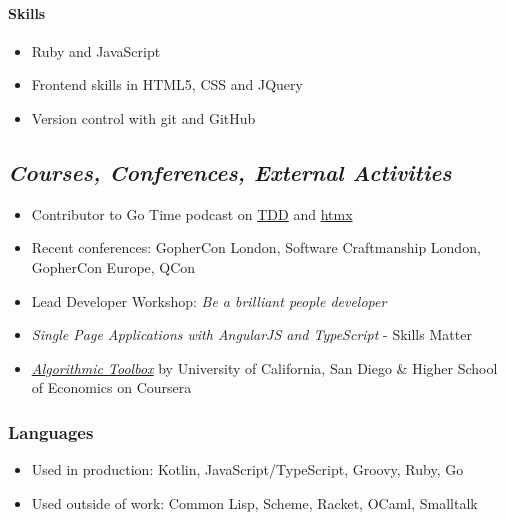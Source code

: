 \hypertarget{skills-2}{%
\paragraph{Skills}\label{skills-2}}

\begin{itemize}
\tightlist
\item
  Ruby and JavaScript
\item
  Frontend skills in HTML5, CSS and JQuery
\item
  Version control with git and GitHub
\end{itemize}

\hypertarget{courses-conferences-external-activities}{%
\subsection{\texorpdfstring{\emph{Courses, Conferences, External
Activities}}{Courses, Conferences, External Activities}}\label{courses-conferences-external-activities}}

\begin{itemize}
\tightlist
\item
  Contributor to Go Time podcast on
  \href{https://changelog.com/gotime/185}{TDD} and
  \href{https://changelog.com/gotime/266}{htmx}
\item
  Recent conferences: GopherCon London, Software Craftmanship London,
  GopherCon Europe, QCon
\item
  Lead Developer Workshop: \emph{Be a brilliant people developer}
\item
  \emph{Single Page Applications with AngularJS and TypeScript} - Skills
  Matter
\item
  \href{https://www.coursera.org/account/accomplishments/records/C58NGM7GQS84}{\emph{Algorithmic
  Toolbox}} by University of California, San Diego \& Higher School of
  Economics on Coursera
\end{itemize}

\hypertarget{languages}{%
\subsubsection{Languages}\label{languages}}

\begin{itemize}
\tightlist
\item
  Used in production: Kotlin, JavaScript/TypeScript, Groovy, Ruby, Go
\item
  Used outside of work: Common Lisp, Scheme, Racket, OCaml, Smalltalk
\end{itemize}

